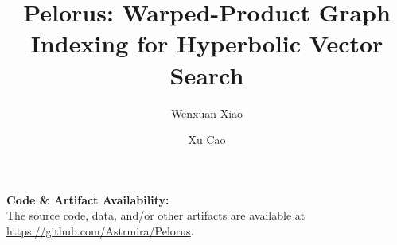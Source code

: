 \documentclass[sigconf, nonacm, balance=false]{acmart}
\theoremstyle{definition}
\newif\ifpreprint
\newcommand\codeavailabilityurl{https://github.com/Astrmira/Pelorus}
\begin{document}
\title[Pelorus: Warped-Product Graph Indexing for Hyperbolic Vector Search]{Pelorus: Warped-Product Graph Indexing for Hyperbolic Vector Search}

\author{Wenxuan Xiao}

\author{Xu Cao}

\begin{abstract}

\end{abstract}

\maketitle

\pagestyle{plain}
\vspace{.3cm}
\begingroup\small\noindent\raggedright\textbf{Code \& Artifact Availability:}\\
The source code, data, and/or other artifacts are available at \url{\codeavailabilityurl}.
\endgroup













\ifpreprint
\clearpage
\appendix

\fi
\end{document}
